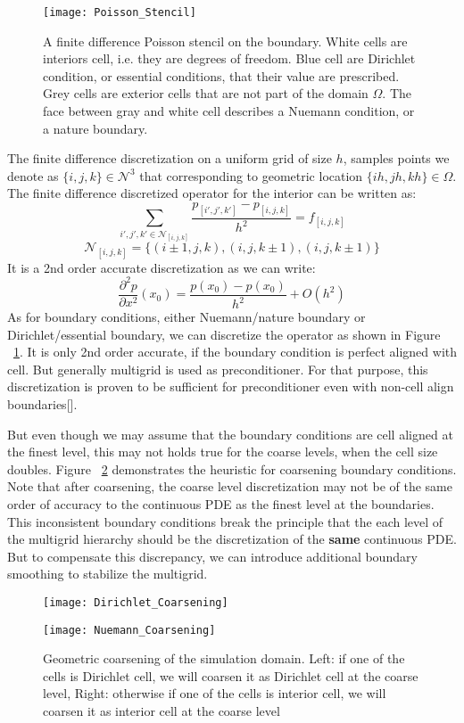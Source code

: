 \begin{figure}[t]
\texttt{[image: Poisson\_Stencil]}
\centering
\caption{A finite difference Poisson stencil on the boundary. White cells are interiors cell, i.e. they are degrees of freedom. Blue cell are Dirichlet condition, or essential conditions, that their value are prescribed. Grey cells are exterior cells that are not part of the domain $\Omega$. The face between gray and white cell describes a Nuemann condition, or a nature boundary.}
\label{fig:PoissonBoundary}
\end{figure}

The finite difference discretization on a uniform grid of size $h$, samples points we denote as $\{i,j,k\} \in \mathcal{N}^3$ that corresponding to geometric location $\{ih,jh,kh\} \in \Omega$. The finite difference discretized operator for the interior can be written as:
\begin{equation}
\sum_{i',j',k'\in \mathcal{N}_{[i,j,k]}}\frac{p_{[i',j',k']}-p_{[i,j,k]}}{h^2} = f_{[i,j,k]}
\end{equation}
$$
\mathcal{N}_{[i,j,k]} = \{(i\pm1,j,k),(i,j,k\pm1),(i,j,k\pm1)\}
$$
It is a 2nd order accurate discretization as we can write:
$$
\frac{\partial^2 p}{\partial x^2}(x_0) = \frac{p(x_0)-p(x_0)}{h^2} + O(h^2)
$$
As for boundary conditions, either Nuemann/nature boundary or Dirichlet/essential boundary, we can discretize the operator as shown in Figure ~\ref{fig:PoissonBoundary}. It is only 2nd order accurate, if the boundary condition is perfect aligned with cell. But generally multigrid is used as preconditioner. For that purpose, this discretization is proven to be sufficient for preconditioner even with non-cell align boundaries[\cite{aanjaneya2017power}]. 

But even though we may assume that the boundary conditions are cell aligned at the finest level, this may not holds true for the coarse levels, when the cell size doubles. Figure ~\ref{fig:GeometricCoarsening} demonstrates the heuristic for coarsening boundary conditions. Note that after coarsening, the coarse level discretization may not be of the same order of accuracy to the continuous PDE as the finest level at the boundaries. This inconsistent boundary conditions break the principle that the each level of the multigrid hierarchy should be the discretization of the \textbf{same} continuous PDE. But to compensate this discrepancy, we can introduce additional boundary smoothing to stabilize the multigrid.
\begin{figure}[t]
\centering
\begin{minipage}{.5\textwidth}
  \centering
  \texttt{[image: Dirichlet\_Coarsening]}
\end{minipage}%
\begin{minipage}{.5\textwidth}
  \centering
  \texttt{[image: Nuemann\_Coarsening]}
\end{minipage}
  \caption{Geometric coarsening of the simulation domain. Left: if one of the cells is Dirichlet cell, we will coarsen it as Dirichlet cell at the coarse level, Right: otherwise if one of the cells is interior cell, we will coarsen it as interior cell at the coarse level}
  \label{fig:GeometricCoarsening}
\end{figure}
